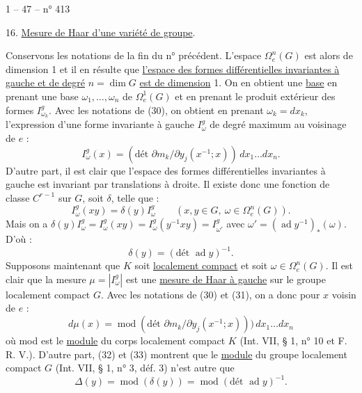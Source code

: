 1 -- 47 -- \hfill n° 413

16. \uline{Mesure de Haar d'une variété de groupe}.

Conservons les notations de la fin du n° précédent. L'espace $\Omega_e^n(G)$ est alors
de dimension 1 et il en résulte que \uline{l'espace des formes différentielles invariantes
à gauche et de degré} $n=\dim G$ \uline{est de dimension} 1. On en obtient une \uline{base} en
prenant une base $\omega_1,\ldots,\omega_n$ de $\Omega_e^1(G)$ et en prenant le produit extérieur des
formes $I_{\omega_k}^g$. Avec les notations de (30), on obtient en prenant $\omega_k=dx_k$, l'expression
d'une forme invariante à gauche $I_\omega^g$ de degré maximum au voisinage de $e$ :
\[
\tag{31} I_\omega^g(x)=(\text{dét }\partial m_k/\partial y_j(x^{-1};x))\,dx_1\ldots dx_n.
\]
D'autre part, il est clair que l'espace des formes différentielles invariantes
à gauche est invariant par translations à droite. Il existe donc une fonction de
classe $C^{r-1}$ sur $G$, soit $\delta$, telle que :
\[
\tag{32} I_\omega^g(xy)=\delta(y)I_\omega^g\qquad(x,y\in G,\ \omega\in\Omega_e^n(G)).
\]
Mais on a $\delta(y)I_\omega^g=I_\omega^g(xy)=I_\omega^g(y^{-1}xy)=I_{\omega'}^g$ avec $\omega'=(\operatorname{ad}y^{-1})_*(\omega)$. D'où :
\[
\tag{33} \delta(y)=(\text{dét }\operatorname{ad}y)^{-1}.
\]
Supposons maintenant que $K$ soit \uline{localement compact} et soit $\omega\in\Omega_e^n(G)$.
Il est clair que la mesure $\mu=|I_\omega^g|$ est une \uline{mesure de Haar à gauche} sur le groupe
localement compact $G$. Avec les notations de (30) et (31), on a donc pour $x$ voisin
de $e$ :
\[
\tag{34} d\mu(x)=\operatorname{mod}(\text{dét }\partial m_k/\partial y_j(x^{-1};x)))\,dx_1\ldots dx_n
\]
où mod est le \uline{module} du corps localement compact $K$ (Int. VII, § 1, n° 10 et F. R. V.).
D'autre part, (32) et (33) montrent que le \uline{module} du groupe localement compact $G$
(Int. VII, § 1, n° 3, déf. 3) n'est autre que
\[
\tag{35} \Delta(y)=\operatorname{mod}(\delta(y))=\operatorname{mod}(\text{dét }\operatorname{ad}y)^{-1}.
\]
